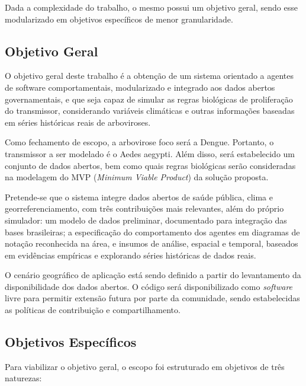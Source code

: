 Dada a complexidade do trabalho, o mesmo possui um objetivo geral, sendo esse modularizado em objetivos específicos de menor granularidade.

\subsection{Objetivo Geral}
\label{1-objetivos-gerais}

O objetivo geral deste trabalho é a obtenção de um sistema orientado a agentes de software comportamentais,
modularizado e integrado aos dados abertos governamentais, e que seja capaz de simular as regras biológicas
de proliferação do transmissor, considerando variáveis climáticas e outras informações baseadas em
séries históricas reais de arboviroses. 

Como fechamento de escopo, a arbovirose foco será a Dengue. Portanto, o transmissor a ser modelado é o Aedes
aegypti. Além disso, será estabelecido um conjunto de dados abertos, bem como quais regras biológicas
serão consideradas na modelagem do MVP (\textit{Minimum Viable Product}) da solução proposta.

Pretende-se que o sistema integre dados abertos de saúde pública, clima e georreferenciamento,
com três contribuições mais relevantes, além do próprio simulador: um modelo de dados preliminar,
documentado para integração das bases brasileiras; a especificação do comportamento dos agentes em
diagramas de notação reconhecida na área, e insumos de análise, espacial e temporal, baseados em evidências
empíricas e explorando séries históricas de dados reais. 

O cenário geográfico de aplicação está sendo definido a partir do levantamento da disponibilidade dos
dados abertos. O código será disponibilizado como \textit{software} livre para permitir extensão futura por parte da
comunidade, sendo estabelecidas as políticas de contribuição e compartilhamento.


\subsection{Objetivos Específicos}
\label{1-objetivos-especificos}

Para viabilizar o objetivo geral, o escopo foi estruturado em objetivos de três
naturezas:

